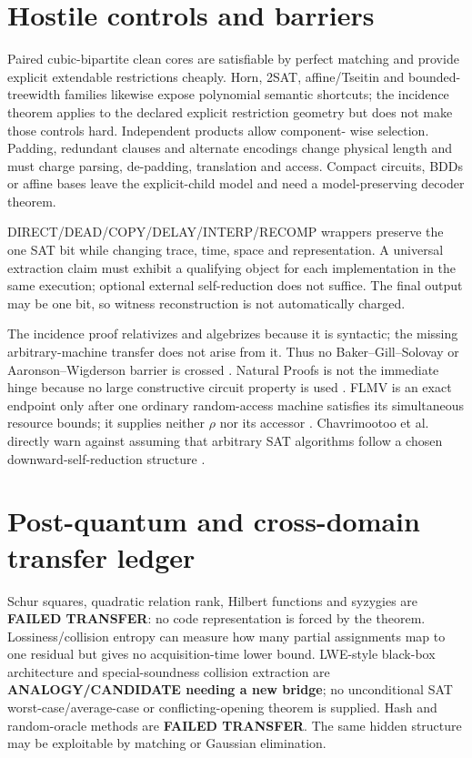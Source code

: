 \documentclass[11pt]{article}
\begin{document}
\section{Hostile controls and barriers}

Paired cubic-bipartite clean cores are satisfiable by perfect matching and
provide explicit extendable restrictions cheaply.  Horn, 2SAT, affine/Tseitin
and bounded-treewidth families likewise expose polynomial semantic shortcuts;
the incidence theorem applies to the declared explicit restriction geometry
but does not make those controls hard.  Independent products allow component-
wise selection.  Padding, redundant clauses and alternate encodings change
physical length and must charge parsing, de-padding, translation and access.
Compact circuits, BDDs or affine bases leave the explicit-child model and need
a model-preserving decoder theorem.

DIRECT/DEAD/COPY/DELAY/INTERP/RECOMP wrappers preserve the one SAT bit while
changing trace, time, space and representation.  A universal extraction claim
must exhibit a qualifying object for each implementation in the same
execution; optional external self-reduction does not suffice.  The final
output may be one bit, so witness reconstruction is not automatically charged.

The incidence proof relativizes and algebrizes because it is syntactic; the
missing arbitrary-machine transfer does not arise from it.  Thus no
Baker--Gill--Solovay or Aaronson--Wigderson barrier is crossed
\cite{bgs,aw}.  Natural Proofs is not the immediate hinge because no large
constructive circuit property is used \cite{rr}.  FLMV is an exact endpoint
only after one ordinary random-access machine satisfies its simultaneous
resource bounds; it supplies neither $\rho$ nor its accessor \cite{flmv}.
Chavrimootoo et al. directly warn against assuming that arbitrary SAT
algorithms follow a chosen downward-self-reduction structure \cite{chkln}.

\section{Post-quantum and cross-domain transfer ledger}

Schur squares, quadratic relation rank, Hilbert functions and syzygies are
\textbf{FAILED TRANSFER}: no code representation is forced by the theorem.
Lossiness/collision entropy can measure how many partial assignments map to
one residual but gives no acquisition-time lower bound.  LWE-style black-box
architecture and special-soundness collision extraction are
\textbf{ANALOGY/CANDIDATE needing a new bridge}; no unconditional SAT
worst-case/average-case or conflicting-opening theorem is supplied.  Hash and
random-oracle methods are \textbf{FAILED TRANSFER}.  The same hidden
structure may be exploitable by matching or Gaussian elimination.
\end{document}
